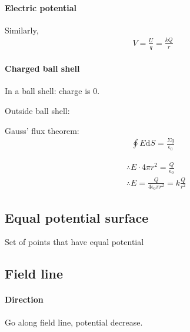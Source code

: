         \paragraph{Electric potential}
            Similarly,
            \begin{align}
                V = \frac{U}{q} = \frac{kQ}{r}
            \end{align}
        
        \paragraph{Charged ball shell}
            In a ball shell: charge is 0.

            Outside ball shell:

            Gauss' flux theorem:
            \begin{align}
                \oint E \mathrm{d} S = \frac{\Sigma q}{\epsilon_0}
            \end{align}

            \begin{align}
                & \therefore E \cdot 4 \pi r^2 = \frac{Q}{\epsilon_0} \\
                & \therefore E = \frac{Q}{4 \epsilon_0 \pi r^2} = k \frac{Q}{r^2}
            \end{align}


    \subsection{Equal potential surface}
        Set of points that have equal potential

    \subsection{Field line}
        \paragraph{Direction}
            Go along field line, potential decrease.

    

        